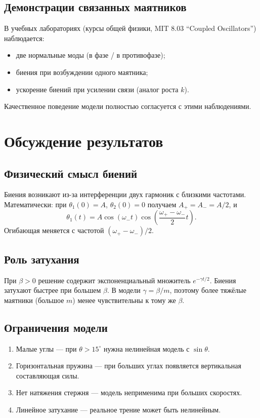\documentclass[12pt,a4paper]{article}
\begin{document}
\subsection{Демонстрации связанных маятников}

В учебных лабораториях (курсы общей физики, MIT 8.03 ``Coupled Oscillators'')
наблюдается:
\begin{itemize}
  \item две нормальные моды (в фазе / в противофазе);
  \item биения при возбуждении одного маятника;
  \item ускорение биений при усилении связи (аналог роста \(k\)).
\end{itemize}
Качественное поведение модели полностью согласуется с этими наблюдениями.

\section{Обсуждение результатов}

\subsection{Физический смысл биений}

Биения возникают из-за интерференции двух гармоник с близкими частотами.
Математически: при \(\theta_1(0)=A\), \(\theta_2(0)=0\) получаем
\(A_+=A_-=A/2\), и
\[
\theta_1(t)=A\cos(\omega_- t)\cos\!\left(\frac{\omega_+-\omega_-}{2}t\right).
\]
Огибающая меняется с частотой \((\omega_+-\omega_-)/2\).

\subsection{Роль затухания}

При \(\beta>0\) решение содержит экспоненциальный множитель \(e^{-\gamma t/2}\).
Биения затухают быстрее при большем \(\beta\). В модели \(\gamma=\beta/m\),
поэтому более тяжёлые маятники (большое \(m\)) менее чувствительны к тому же \(\beta\).

\subsection{Ограничения модели}

\begin{enumerate}
  \item Малые углы --- при \(\theta>15^\circ\) нужна нелинейная модель
        с \(\sin\theta\).
  \item Горизонтальная пружина --- при больших углах появляется вертикальная
        составляющая силы.
  \item Нет натяжения стержня --- модель неприменима при больших скоростях.
  \item Линейное затухание --- реальное трение может быть нелинейным.
\end{enumerate}
\end{document}
